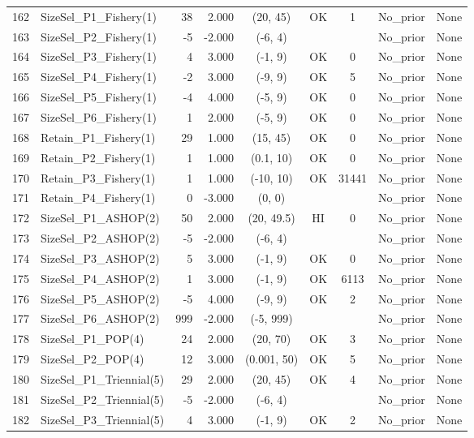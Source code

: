 \documentclass[12pt,]{article}
\begin{document}
\begin{landscape}
\begin{longtable}{rlrrcccll}
  162 & SizeSel\_P1\_Fishery(1) & 38 & 2.000 & (20, 45) & OK & 1 & No\_prior & None \\ 
  163 & SizeSel\_P2\_Fishery(1) & -5 & -2.000 & (-6, 4) &  &  & No\_prior & None \\ 
  164 & SizeSel\_P3\_Fishery(1) & 4 & 3.000 & (-1, 9) & OK & 0 & No\_prior & None \\ 
  165 & SizeSel\_P4\_Fishery(1) & -2 & 3.000 & (-9, 9) & OK & 5 & No\_prior & None \\ 
  166 & SizeSel\_P5\_Fishery(1) & -4 & 4.000 & (-5, 9) & OK & 0 & No\_prior & None \\ 
  167 & SizeSel\_P6\_Fishery(1) & 1 & 2.000 & (-5, 9) & OK & 0 & No\_prior & None \\ 
  168 & Retain\_P1\_Fishery(1) & 29 & 1.000 & (15, 45) & OK & 0 & No\_prior & None \\ 
  169 & Retain\_P2\_Fishery(1) & 1 & 1.000 & (0.1, 10) & OK & 0 & No\_prior & None \\ 
  170 & Retain\_P3\_Fishery(1) & 1 & 1.000 & (-10, 10) & OK & 31441 & No\_prior & None \\ 
  171 & Retain\_P4\_Fishery(1) & 0 & -3.000 & (0, 0) &  &  & No\_prior & None \\ 
  172 & SizeSel\_P1\_ASHOP(2) & 50 & 2.000 & (20, 49.5) & HI & 0 & No\_prior & None \\ 
  173 & SizeSel\_P2\_ASHOP(2) & -5 & -2.000 & (-6, 4) &  &  & No\_prior & None \\ 
  174 & SizeSel\_P3\_ASHOP(2) & 5 & 3.000 & (-1, 9) & OK & 0 & No\_prior & None \\ 
  175 & SizeSel\_P4\_ASHOP(2) & 1 & 3.000 & (-1, 9) & OK & 6113 & No\_prior & None \\ 
  176 & SizeSel\_P5\_ASHOP(2) & -5 & 4.000 & (-9, 9) & OK & 2 & No\_prior & None \\ 
  177 & SizeSel\_P6\_ASHOP(2) & 999 & -2.000 & (-5, 999) &  &  & No\_prior & None \\ 
  178 & SizeSel\_P1\_POP(4) & 24 & 2.000 & (20, 70) & OK & 3 & No\_prior & None \\ 
  179 & SizeSel\_P2\_POP(4) & 12 & 3.000 & (0.001, 50) & OK & 5 & No\_prior & None \\ 
  180 & SizeSel\_P1\_Triennial(5) & 29 & 2.000 & (20, 45) & OK & 4 & No\_prior & None \\ 
  181 & SizeSel\_P2\_Triennial(5) & -5 & -2.000 & (-6, 4) &  &  & No\_prior & None \\ 
  182 & SizeSel\_P3\_Triennial(5) & 4 & 3.000 & (-1, 9) & OK & 2 & No\_prior & None \\ 

\end{longtable}
\end{landscape}
\end{document}
